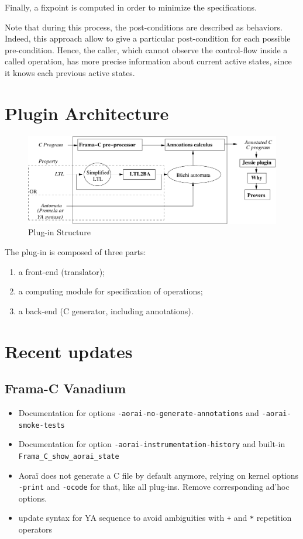 \documentclass{report}
\begin{document}
Finally, a fixpoint is computed in order to minimize the specifications.

Note that during this process, the post-conditions are described as
behaviors. Indeed, this approach allow to give a particular post-condition for
each possible pre-condition. Hence, the caller, which cannot observe the
control-flow inside a called operation, has more precise information about
current active states, since it knows each previous active states.

\section{Plugin Architecture}

\begin{figure}[ht]
 \centerline{\includegraphics[width=\textwidth]{Schemas/GeneralView}}
 \caption{Plug-in Structure}
 \label{AoraiGeneralView}
\end{figure}

The plug-in is composed of three parts:
  \begin{enumerate}
    \item a front-end (translator);
    \item a computing module for specification of operations;
    \item a back-end (C generator, including annotations).
  \end{enumerate}


\section{Recent updates}
\subsection{Frama-C Vanadium}
\begin{itemize}
\item Documentation for options \texttt{-aorai-no-generate-annotations}
and \texttt{-aorai-smoke-tests}
\item Documentation for option \texttt{-aorai-instrumentation-history}
and built-in \texttt{Frama\_C\_show\_aorai\_state}
\item Aoraï does not generate a C file by default anymore, relying on
kernel options \texttt{-print} and \texttt{-ocode} for that, like all
plug-ins. Remove corresponding ad'hoc options.
\item update syntax for YA sequence to avoid ambiguities with
 \texttt{+} and \texttt{*} repetition operators
\end{itemize}
\end{document}

